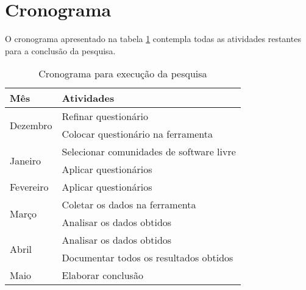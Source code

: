 \section{Cronograma}
\label{cronograma}

O cronograma apresentado na tabela \ref{tab:cronograma} contempla todas as atividades restantes para a conclusão da pesquisa.

\begin{table}[H]
\center
\begin{tabular}{|l|p{8cm}|}
\hline
\textbf{Mês} & \textbf{Atividades} \\ \hline
\multirow{2}{*}{Dezembro} 
		& Refinar questionário \\ 
		& Colocar questionário na ferramenta\\ \hline
\multirow{2}{*}{Janeiro}
		& Selecionar comunidades de software livre \\
		& Aplicar questionários \\ \hline
\multirow{1}{*}{Fevereiro}
		& Aplicar questionários \\ \hline
\multirow{2}{*}{Março}
		& Coletar os dados na ferramenta \\
		& Analisar os dados obtidos \\ \hline
\multirow{2}{*}{Abril} 
		& Analisar os dados obtidos \\
		& Documentar todos os resultados obtidos \\ \hline
\multirow{1}{*}{Maio}    		
		&Elaborar conclusão \\ \hline
\end{tabular}
\caption{Cronograma para execução da pesquisa}
\label{tab:cronograma}
\end{table}